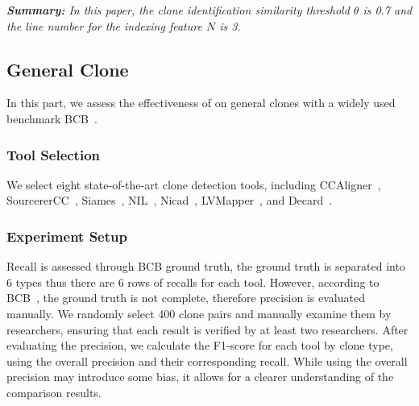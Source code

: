 
\begin{titleEnv}
\emph{
\textbf{Summary:}
In this paper, the clone identification similarity threshold $\theta$ is 0.7 and the line number for the indexing feature $N$ is 3.
}
\end{titleEnv}

\subsection{General Clone}\label{sec:rq3}
In this part, we assess the effectiveness of \toolname on general clones with a widely used benchmark BCB~\cite{big}.

\subsubsection{Tool Selection}
We select eight state-of-the-art clone detection tools, including CCAligner~\cite{wang2018ccaligner}, SourcererCC~\cite{sajnani2016sourcerercc}, Siames~\cite{Ragkhitwetsagul2019SiameseSA}, NIL~\cite{nil2021}, Nicad~\cite{roy2008nicad}, LVMapper~\cite{lvmapper2020}, and Decard~\cite{jiang2007deckard}. 

\subsubsection{Experiment Setup}
Recall is assessed through BCB ground truth, the ground truth is separated into 6 types thus there are 6 rows of recalls for each tool. However, according to BCB~\cite{big}, the ground truth is not complete, therefore precision is evaluated manually. 
We randomly select 400 clone pairs and manually examine them by researchers, ensuring that each result is verified by at least two researchers. After evaluating the precision, we calculate the F1-score for each tool by clone type, using the overall precision and their corresponding recall. While using the overall precision may introduce some bias, it allows for a clearer understanding of the comparison results.

